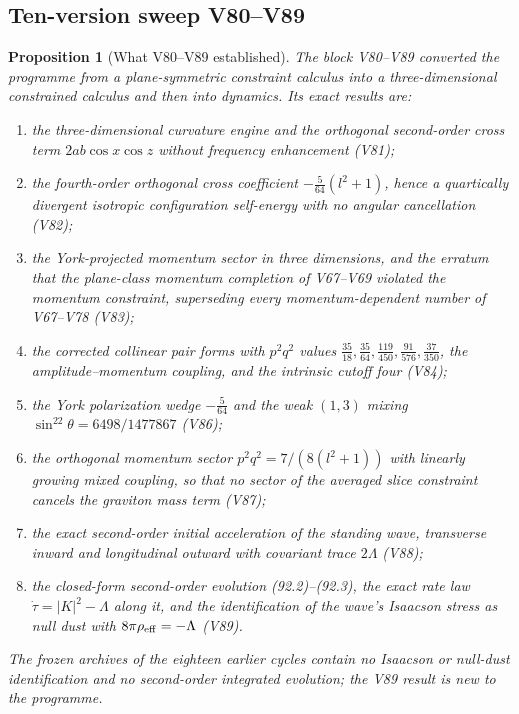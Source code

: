 \documentclass[11pt]{article}
\newtheorem{proposition}[theorem]{Proposition}
\theoremstyle{remark}
\begin{document}
\subsection{Ten-version sweep V80--V89}

\begin{proposition}[What V80--V89 established]
\label{prop:v19v90-sweep}
The block V80--V89 converted the programme from a plane-symmetric
constraint calculus into a three-dimensional constrained calculus and
then into dynamics.  Its exact results are:

\begin{enumerate}
\item the three-dimensional curvature engine and the orthogonal
second-order cross term \(2ab\cos x\cos z\) without frequency
enhancement (V81);
\item the fourth-order orthogonal cross coefficient
\(-\tfrac5{64}(l^2+1)\), hence a quartically divergent isotropic
configuration self-energy with no angular cancellation (V82);
\item the York-projected momentum sector in three dimensions, and the
erratum that the plane-class momentum completion of V67--V69 violated
the momentum constraint, superseding every momentum-dependent number
of V67--V78 (V83);
\item the corrected collinear pair forms with \(p^2q^2\) values
\(\tfrac{35}{18},\tfrac{35}{64},\tfrac{119}{450},\tfrac{91}{576},\tfrac{37}{350}\),
the amplitude--momentum coupling, and the intrinsic cutoff four (V84);
\item the York polarization wedge \(-\tfrac5{64}\) and the weak
\((1,3)\) mixing \(\sin^22\theta=6498/1477867\) (V86);
\item the orthogonal momentum sector \(p^2q^2=7/(8(l^2+1))\) with
linearly growing mixed coupling, so that no sector of the averaged
slice constraint cancels the graviton mass term (V87);
\item the exact second-order initial acceleration of the standing
wave, transverse inward and longitudinal outward with covariant trace
\(2\Lambda\) (V88);
\item the closed-form second-order evolution (92.2)--(92.3), the exact
rate law \(\dot\tau=|K|^2-\Lambda\) along it, and the identification
of the wave's Isaacson stress as null dust with
\(8\pi\rho_{\rm eff}=-\Lambda\) (V89).
\end{enumerate}

The frozen archives of the eighteen earlier cycles contain no
Isaacson or null-dust identification and no second-order integrated
evolution; the V89 result is new to the programme.
\end{proposition}
\end{document}
